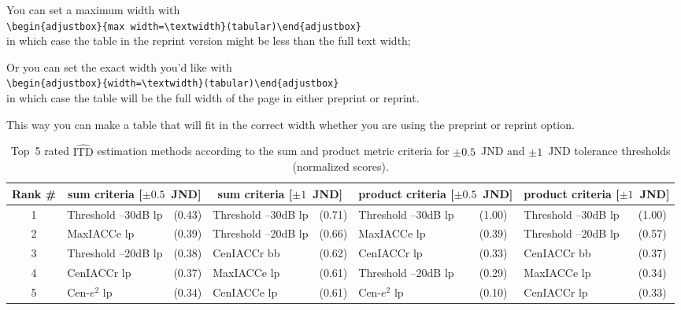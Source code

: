 \documentclass[reprint]{JASA}
\begin{document}
You can set a maximum width with \\
\verb+\begin{adjustbox}{max width=\textwidth}(tabular)\end{adjustbox}+\\  
in which case the table in the reprint version might be less than
the full text width;

Or you can set the exact width you'd like with\\
\verb+\begin{adjustbox}{width=\textwidth}(tabular)\end{adjustbox}+\\
in which case the table will be the full width of the page in
either preprint or reprint.

This way you can make a table that will fit in the correct width
whether you are using the preprint or reprint option.

\begin{table}[b]
\caption{Top~5 rated $\widehat{\textrm{ITD}}$ estimation methods
according to the sum and product metric criteria for $\pm0.5$~JND and
$\pm1$~JND tolerance thresholds (normalized scores).}

\begin{adjustbox}{width=\textwidth}
\begin{tabular}{c| l l| l l| l l| l l}
\hline\hline
Rank \#& \multicolumn{2}{c}{sum criteria [$\pm0.5$~JND]} &
\multicolumn{2}{|c}{sum criteria [$\pm1$~JND]} &
\multicolumn{2}{|c}{product criteria [$\pm0.5$~JND]} & \multicolumn{2}{|c}{product criteria [$\pm1$~JND]}\\ 
\hline
1 & Threshold --30dB {lp} & (0.43) & Threshold --30dB {lp} & (0.71) & Threshold --30dB {lp} & (1.00) & Threshold --30dB {lp} & (1.00) \\ 
2 & MaxIACCe {lp} & (0.39) & Threshold --20dB {lp} & (0.66) & MaxIACCe {lp} & (0.39) & Threshold --20dB {lp} & (0.57) \\ 
3 & Threshold --20dB {lp} & (0.38) & CenIACCr {bb} &(0.62) & CenIACCr {lp} &(0.33) & CenIACCr {bb} & (0.37) \\ 
4 & CenIACCr {lp} &(0.37) & MaxIACCe {lp} & (0.61) & Threshold --20dB {lp} & (0.29) & MaxIACCe {lp} & (0.34) \\ 
5 & Cen-$e^2$ {lp} &(0.34) & CenIACCe {lp} & (0.61) & Cen-$e^2$ {lp}
& (0.10) & CenIACCr {lp} & (0.33) \\
\hline\hline
\end{tabular}
\end{adjustbox}

\label{tab:topMethods} 
\end{table}
\end{document}
